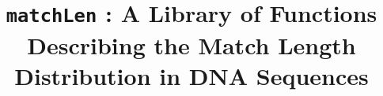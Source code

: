

\pagestyle{noweb}

\title{\texttt{matchLen} : A Library of Functions
  Describing the Match Length Distribution in DNA Sequences}
\author{}

\date{}
\maketitle






